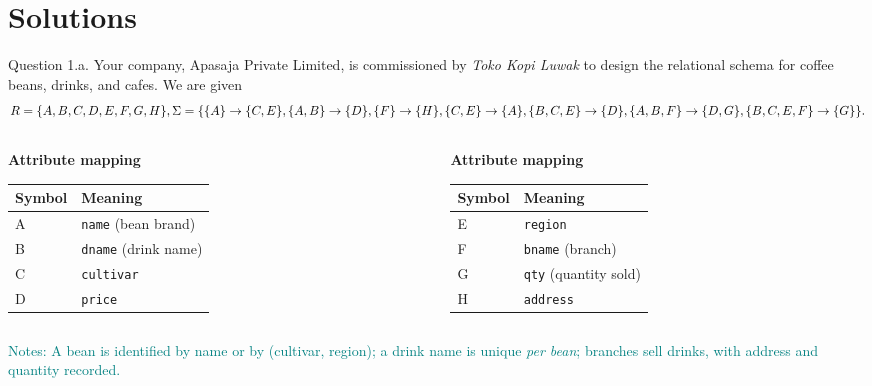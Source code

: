 \documentclass{beamer}
\begin{document}
\section{Solutions}

\begin{frame}[fragile]{Question 1.a.}
\tiny
Your company, Apasaja Private Limited, is commissioned by \emph{Toko Kopi Luwak} to design the relational schema for coffee beans, drinks, and cafes. We are given
\[
R=\{A,B,C,D,E,F,G,H\},\\
\Sigma=\{\{A\} \to \{C,E\},\{A,B\} \to \{D\},\{F\} \to \{H\},\{C,E\} \to \{A\},\{B,C,E\} \to \{D\},\{A,B,F\} \to \{D,G\},\{B,C,E,F\} \to \{G\}\}.
\]

\pause
\footnotesize
\vspace{0.5em}
\begin{columns}
\begin{column}{0.48\textwidth}
\vspace{0.5em}
\textbf{Attribute mapping}\\[-0.2em]
\begin{tabular}{@{}ll@{}}
\toprule
\textbf{Symbol} & \textbf{Meaning} \\
\midrule
A & \texttt{name} (bean brand) \\
B & \texttt{dname} (drink name) \\
C & \texttt{cultivar} \\
D & \texttt{price} \\
\bottomrule
\end{tabular}
\end{column}
\pause
\begin{column}{0.48\textwidth}
\textbf{Attribute mapping}\\[-0.2em]
\begin{tabular}{@{}ll@{}}
\toprule
\textbf{Symbol} & \textbf{Meaning} \\
\midrule
E & \texttt{region} \\
F & \texttt{bname} (branch) \\
G & \texttt{qty} (quantity sold) \\
H & \texttt{address} \\
\bottomrule
\end{tabular}
\end{column}
\end{columns}

\medskip
\scriptsize
\textcolor{teal}{Notes: A bean is identified by \alert{name} or by \alert{(cultivar, region)}; a drink name is unique \emph{per bean}; branches sell drinks, with address and quantity recorded.}
\end{frame}
\end{document}
